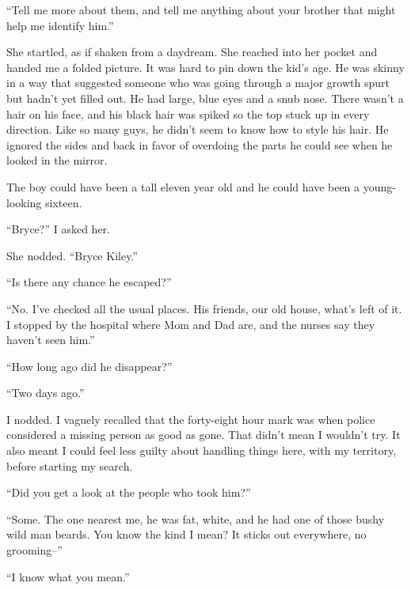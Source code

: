 ``Tell me more about them, and tell me anything about your brother that might help me identify him.''



She startled, as if shaken from a daydream.  She reached into her pocket and handed me a folded picture.  It was hard to pin down the kid's age.  He was skinny in a way that suggested someone who was going through a major growth spurt but hadn't yet filled out.  He had large, blue eyes and a snub nose.  There wasn't a hair on his face, and his black hair was spiked so the top stuck up in every direction.  Like so many guys, he didn't seem to know how to style his hair.  He ignored the sides and back in favor of overdoing the parts he could see when he looked in the mirror.



The boy could have been a tall eleven year old and he could have been a young-looking sixteen.



``Bryce?'' I asked her.



She nodded.  ``Bryce Kiley.''



``Is there any chance he escaped?''



``No.  I've checked all the usual places.  His friends, our old house, what's left of it.  I stopped by the hospital where Mom and Dad are, and the nurses say they haven't seen him.''



``How long ago did he disappear?''



``Two days ago.''



I nodded.  I vaguely recalled that the forty-eight hour mark was when police considered a missing person as good as gone.  That didn't mean I wouldn't try.  It also meant I could feel less guilty about handling things here, with my territory, before starting my search.



``Did you get a look at the people who took him?''



``Some.  The one nearest me, he was fat, white, and he had one of those bushy wild man beards.  You know the kind I mean?  It sticks out everywhere, no grooming--''



``I know what you mean.''



